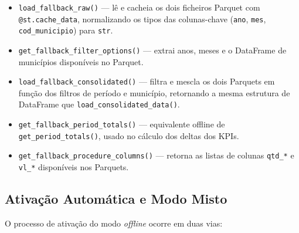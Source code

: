 \documentclass[12pt,a4paper]{report}
\begin{document}
\begin{itemize}
    \item \texttt{load\_fallback\_raw()} — lê e cacheia os dois ficheiros Parquet com
    \texttt{@st.cache\_data}, normalizando os tipos das colunas-chave (\texttt{ano},
    \texttt{mes}, \texttt{cod\_municipio}) para \texttt{str}.
    \item \texttt{get\_fallback\_filter\_options()} — extrai anos, meses e o DataFrame
    de municípios disponíveis no Parquet.
    \item \texttt{load\_fallback\_consolidated()} — filtra e mescla os dois Parquets
    em função dos filtros de período e município, retornando a mesma estrutura de
    DataFrame que \texttt{load\_consolidated\_data()}.
    \item \texttt{get\_fallback\_period\_totals()} — equivalente offline de
    \texttt{get\_period\_totals()}, usado no cálculo dos deltas dos KPIs.
    \item \texttt{get\_fallback\_procedure\_columns()} — retorna as listas de colunas
    \texttt{qtd\_*} e \texttt{vl\_*} disponíveis nos Parquets.
\end{itemize}

\subsection{Ativação Automática e Modo Misto}

O processo de ativação do modo \textit{offline} ocorre em duas vias:
\end{document}
